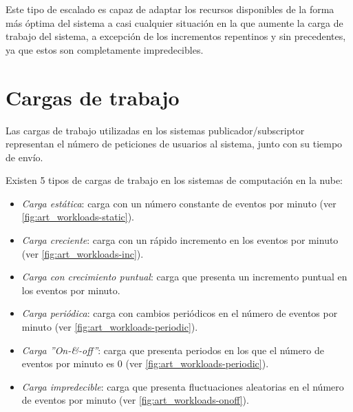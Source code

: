Este tipo de escalado es capaz de adaptar los recursos disponibles de la forma más óptima del sistema 
a casi cualquier situación en la que aumente la carga de trabajo del sistema, a excepción de los 
incrementos repentinos y sin precedentes, ya que estos son completamente impredecibles.




\section{Cargas de trabajo} \label{sct:art_workloads}

Las cargas de trabajo utilizadas en los sistemas publicador/subscriptor 
representan el número de peticiones de usuarios al sistema, junto con su
tiempo de envío\cite{paper:type_of_workloads}.

Existen 5 tipos de cargas de trabajo en los sistemas de computación en la nube:
\begin{itemize}

    \item \textit{Carga estática}: carga con un número constante de eventos 
    por minuto (ver \autoref{fig:art_workloads-static}).

    \item \textit{Carga creciente}: carga con un rápido incremento en los
    eventos por minuto (ver \autoref{fig:art_workloads-inc}).

    \item \textit{Carga con crecimiento puntual}: carga que presenta un 
    incremento puntual en los eventos por minuto.
    
    \item \textit{Carga periódica}: carga con cambios periódicos en el
    número de eventos por minuto (ver \autoref{fig:art_workloads-periodic}).

    \item \textit{Carga ''On-\&-off''}: carga que presenta periodos en los que
    el número de eventos por minuto es 0 (ver \autoref{fig:art_workloads-periodic}).

    \item \textit{Carga impredecible}: carga que presenta fluctuaciones aleatorias
    en el número de eventos por minuto (ver \autoref{fig:art_workloads-onoff}).

\end{itemize}

